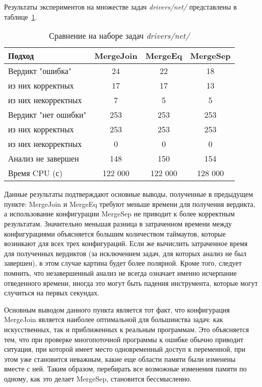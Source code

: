 Результаты экспериментов на множестве задач \textit{drivers/net/} представлены в таблице~\ref{table-drivers-merge}.

  \begin{table}[h]\footnotesize \centering
    \caption{Сравнение на наборе задач \textit{drivers/net/}}
  	\label{table-drivers-merge}
    \begin{tabular}{ | l | c | c | c | }
      \hline
      Подход         				& MergeJoin	& MergeEq 	& MergeSep   \\ \hline
      Вердикт "ошибка" 				& 24    	& 22  		& 18         \\ 
  \hspace{0.5cm} из них корректных 	& 17 		& 17 		& 13      \\ 
  \hspace{0.5cm} из них некорректных & 7 		& 5 		& 5        \\ \hline
      Вердикт "нет ошибки"  		& 253      	& 253        & 253       \\ 
  \hspace{0.5cm} из них корректных 	& 253 		& 253    	& 253        \\
  \hspace{0.5cm} из них некорректных & 0 		& 0    		& 0         \\ \hline
      Анализ не завершен       		& 148     	& 150        & 154       \\ \hline
      Время CPU (с)   				& 122 000 	& 122 000    & 128 000    \\ 
      \hline
    \end{tabular}
  \end{table}

Данные результаты подтверждают основные выводы, полученные в предыдущем пункте: MergeJoin и MergeEq требуют меньше времени для получения вердикта, а использование конфигурации MergeSep не приводит к более корректным результатам. 
Значительно меньшая разница в затраченном времени между конфигурациями объясняется большим количеством таймаутов, которые возникают для всех трех конфигураций. 
Если же вычислить затраченное время для полученных вердиктов (за исключением задач, для которых анализ не был завершен), в этом случае картина будет более полярной.
Кроме того, следует помнить, что незавершенный анализ не всегда означает именно исчерпание отведенного времени, иногда это могут быть падения инструмента, которые могут случиться на первых секундах.

Основным выводом данного пункта является тот факт, что конфигурация MergeJoin является наиболее оптимальной для большинства задач: как искусственных, так и приближенных к реальным программам. 
Это объясняется тем, что при проверке многопоточной программы к ошибке обычно приводит ситуация, при которой имеет место одновременный доступ к переменной, при этом уже становится неважным, какие еще области памяти были изменены вместе с ней.
Таким образом, перебирать все возможные изменения памяти по одному, как это делает MergeSep, становится бессмысленно.

